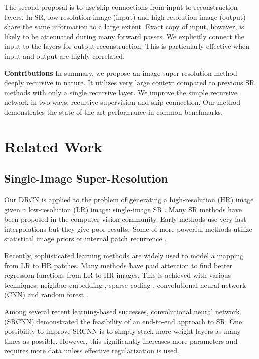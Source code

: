 \documentclass[10pt,twocolumn,letterpaper]{article}
\begin{document}
The second proposal is to use skip-connections from input to reconstruction layers. In SR, low-resolution image (input) and high-resolution image (output) share the same information to a large extent. Exact copy of input, however, is likely to be attenuated during many forward passes. We explicitly connect the input to the layers for output reconstruction. This is particularly effective when input and output are highly correlated.

\textbf{Contributions} In summary, we propose an image super-resolution method deeply recursive in nature. It utilizes very large context compared to previous SR methods with only a single recursive layer. We improve the simple recursive network in two ways: recursive-supervision and skip-connection. Our method demonstrates the state-of-the-art performance in common benchmarks.

\section{Related Work}

\subsection{Single-Image Super-Resolution}

Our DRCN is applied to the problem of generating a high-resolution (HR) image given a low-resolution (LR) image: single-image SR \cite{Irani1991, freeman2000learning,glasner2009super}. Many SR methods have been proposed in the computer vision community. Early methods use very fast interpolations but they give poor results. Some of more powerful methods utilize statistical image priors \cite{sun2008image,Kim2010} or internal patch recurrence \cite{glasner2009super, Huang-CVPR-2015}.

Recently, sophisticated learning methods are widely used to model a mapping from LR to HR patches. Many methods have paid attention to find better regression functions from LR to HR images. This is achieved with various techniques: neighbor embedding \cite{chang2004super,bevilacqua2012}, sparse coding \cite{yang2010image,zeyde2012single,Timofte2013,Timofte}, convolutional neural network (CNN) \cite{dong2014image} and random forest \cite{schulter2015fast}.

Among several recent learning-based successes,  convolutional neural network (SRCNN) \cite{dong2014image} demonstrated the feasibility of an end-to-end approach to SR. One possibility to improve SRCNN is to simply stack more weight layers as many times as possible. However, this significantly increases more parameters and requires more data unless effective regularization is used.  
\end{document}
